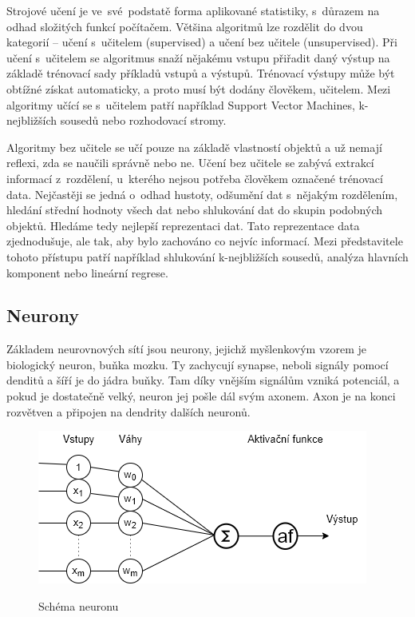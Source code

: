 Strojové učení je ve~své~podstatě forma aplikované statistiky,
s~důrazem na odhad složitých funkcí počítačem.
Většina algoritmů lze rozdělit do dvou kategorií --
učení s~učitelem (supervised) 
a učení bez učitele (unsupervised).
Při učení s~učitelem se algoritmus snaží nějakému vstupu přiřadit daný výstup
na základě trénovací sady příkladů vstupů a výstupů.
Trénovací výstupy může být obtížné získat automaticky,
a proto musí být dodány člověkem, učitelem.
Mezi algoritmy učící se s~učitelem patří například Support Vector Machines,
k-nejbližších sousedů nebo rozhodovací stromy.
\cite{Goodfellow-et-al-2016}
\par

Algoritmy bez učitele se učí pouze na základě vlastností objektů 
a už nemají reflexi, zda se naučili správně nebo ne.
Učení bez učitele se zabývá extrakcí informací z~rozdělení,
u~kterého nejsou potřeba člověkem označené trénovací data.
Nejčastěji se jedná o~odhad hustoty, 
odšumění dat s~nějakým rozdělením,
hledání střední hodnoty všech dat 
nebo shlukování dat do skupin podobných objektů.
Hledáme tedy nejlepší reprezentaci dat.
Tato reprezentace data zjednodušuje, ale tak, 
aby bylo zachováno co nejvíc informací.
Mezi představitele tohoto přístupu patří například 
shlukování k-nejbližších sousedů, 
analýza hlavních komponent nebo lineární regrese. 
\cite{Goodfellow-et-al-2016}

\subsection*{Neurony}
Základem neurovnových sítí jsou neurony,
jejichž myšlenkovým vzorem je biologický neuron, buňka mozku.
Ty zachycují synapse, neboli signály pomocí denditů 
a šíří je do jádra buňky.
Tam díky vnějším signálům vzniká potenciál, 
a pokud je dostatečně velký, 
neuron jej pošle dál svým axonem.
Axon je na konci rozvětven 
a připojen na dendrity dalších neuronů.

\begin{figure}[h]\centering
    \centering
    \includegraphics[width=0.6\linewidth]{obrazky/neuronSchema.png}\\[1pt]  
    \caption{Schéma neuronu}    
    \label{obrazekSchemaNeuronu}
\end{figure}

